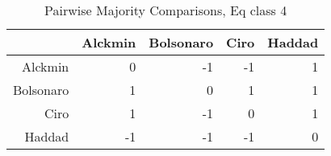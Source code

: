 \begin{table}[ht]
\centering
\begin{tabular}{rrrrr}
  \hline
 & Alckmin & Bolsonaro & Ciro & Haddad \\ 
  \hline
Alckmin & 0 & -1 & -1 & 1 \\ 
  Bolsonaro & 1 & 0 & 1 & 1 \\ 
  Ciro & 1 & -1 & 0 & 1 \\ 
  Haddad & -1 & -1 & -1 & 0 \\ 
   \hline
\end{tabular}
\caption{Pairwise Majority Comparisons, Eq class 4} 
\label{tbl:subtab4}
\end{table}
